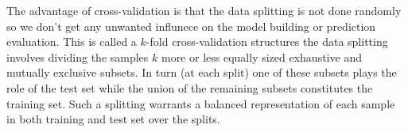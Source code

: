 The advantage of cross-validation is that the data splitting is not done randomly so we don't get any unwanted influnece on the model building or prediction evaluation. This is called a  $k$-fold cross-validation structures the data splitting involves dividing the samples $k$ more or less equally sized exhaustive and
mutually exclusive subsets. In turn (at each split) one of these
subsets plays the role of the test set while the union of the
remaining subsets constitutes the training set. Such a splitting
warrants a balanced representation of each sample in both training and
test set over the splits. 
